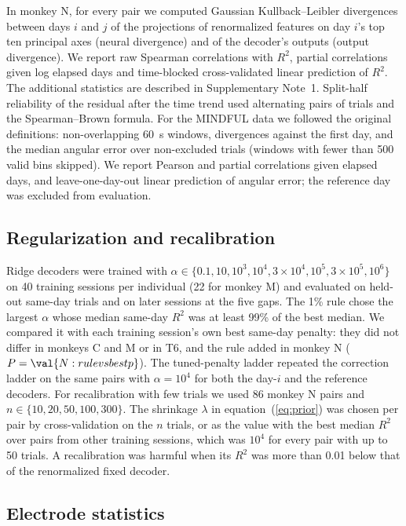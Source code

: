 \documentclass[pdflatex,sn-nature]{sn-jnl}
\begin{document}
In monkey N, for every pair we computed Gaussian Kullback--Leibler divergences between days $i$ and $j$ of the
projections of renormalized features on day $i$'s top ten principal axes (neural divergence) and of the decoder's
outputs (output divergence). We report raw Spearman correlations with $R^2$, partial correlations given log elapsed days
and time-blocked cross-validated linear prediction of $R^2$. The additional statistics are described in Supplementary
Note~1. Split-half reliability of the residual after the time trend used alternating pairs of trials and the
Spearman--Brown formula. For the MINDFUL data we followed the original definitions\cite{pun2024}: non-overlapping 60~s
windows, divergences against the first day, and the median angular error over non-excluded trials (windows with fewer
than 500 valid bins skipped). We report Pearson and partial correlations given elapsed days, and leave-one-day-out
linear prediction of angular error; the reference day was excluded from evaluation.

\subsection*{Regularization and recalibration}

Ridge decoders were trained with $\alpha \in \{0.1, 10, 10^3, 10^4, 3\times10^4, 10^5, 3\times10^5, 10^6\}$ on 40
training sessions per individual (22 for monkey M) and evaluated on held-out same-day trials and on later sessions at
the five gaps. The 1\% rule chose the largest $\alpha$ whose median same-day $R^2$ was at least 99\% of the best median.
We compared it with each training session's own best same-day penalty: they did not differ in monkeys C and M or in
T6, and the rule added  in monkey N ($P = \val{N:rulevsbestp}$). The tuned-penalty ladder repeated the
correction ladder on the same pairs with $\alpha = 10^4$ for both the day-$i$ and the reference decoders. For
recalibration with few trials we used 86 monkey N pairs and $n \in \{10, 20, 50, 100, 300\}$. The shrinkage $\lambda$ in
equation~(\ref{eq:prior}) was chosen per pair by cross-validation on the $n$ trials, or as the value with the best median
$R^2$ over pairs from other training sessions, which was $10^4$ for every pair with up to 50 trials. A recalibration was
harmful when its $R^2$ was more than 0.01 below that of the renormalized fixed decoder.

\subsection*{Electrode statistics}
\end{document}
